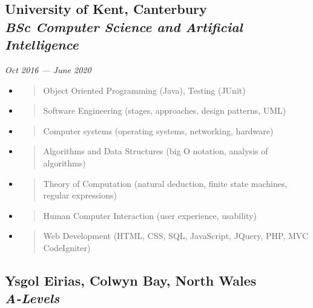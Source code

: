 \documentclass[a4paper, 13pt, draft]{article}
\newcommand{\timeperiod}[2]{%
    \textit{\small{#1 --- #2}}
}
\begin{document}
    \begin{multicols}{2}

	\subsection*{University of Kent, \small{Canterbury}\\  
	\emph{BSc Computer Science and Artificial Intelligence}}

	\timeperiod{Oct 2016}{June 2020}

	\begin{itemize}
	    \setlength\itemsep{0em}
	\item
	    \begin{quote}
		Object Oriented Programming (Java), Testing (JUnit)
	    \end{quote}
	\item
	    \begin{quote}
		Software Engineering (stages, approaches, design patterns, UML)
	    \end{quote}
	\item
	    \begin{quote}
		Computer systems (operating systems, networking, hardware)
	    \end{quote}
	\item
	    \begin{quote}
		Algorithms and Data Structures (big O notation, analysis of
		algorithms)
	    \end{quote}
	\item
	    \begin{quote}
		Theory of Computation (natural deduction, finite state machines,
		regular expressions)
	    \end{quote}
	\item
	    \begin{quote}
		Human Computer Interaction (user experience, usability)
	    \end{quote}
	\item
	    \begin{quote}
		Web Development (HTML, CSS, SQL, JavaScript, JQuery, PHP, MVC
		CodeIgniter)
	    \end{quote}
    \end{itemize}

    \subsection*{Ysgol Eirias, \small{Colwyn Bay, North Wales} \\ \emph{A-Levels}}


\end{multicols}
\end{document}
